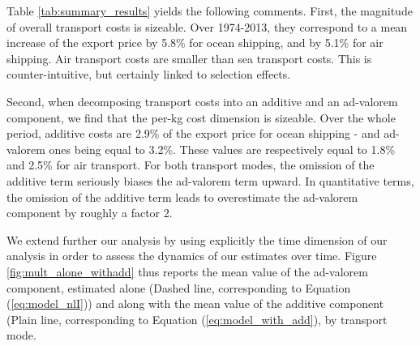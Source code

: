 \documentclass[a4paper,11pt]{article}
\begin{document}
Table \ref{tab:summary_results} yields the following comments. First, the magnitude of overall transport costs is sizeable. Over 1974-2013, they correspond to a mean increase of the export price by 5.8\% for ocean shipping, and by 5.1\% for air shipping. Air transport costs are smaller than sea transport costs. This is counter-intuitive, but certainly linked to selection effects. 


Second, when decomposing transport costs into an additive and an ad-valorem component, we find that the per-kg cost dimension is sizeable. Over the whole period, additive costs are 2.9\% of the export price for ocean shipping  - and ad-valorem ones being equal to 3.2\%. These values are respectively equal to 1.8\% and 2.5\% for air transport. For both transport modes, the omission of the additive term seriously biases the ad-valorem term upward. In quantitative terms, the omission of the additive term leads to overestimate the ad-valorem component by roughly a factor 2.

We extend further our analysis by using explicitly the time dimension of our analysis in order to assess the dynamics of our estimates over time. Figure \ref{fig:mult_alone_withadd} thus reports the mean value of the ad-valorem component, estimated alone (Dashed line, corresponding to Equation (\ref{eq:model_nlI})) and along with the mean value of the additive component (Plain line, corresponding to Equation (\ref{eq:model_with_add}), by transport mode.
\end{document}
